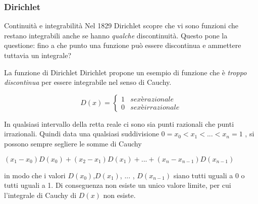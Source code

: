 \begin{frame}[label=Dirichlet]
  \frametitle{Dirichlet}
  \begin{block}{Continuità e integrabilità}    
  Nel 1829 Dirichlet scopre che vi sono funzioni che restano integrabili anche se hanno \textit{qualche} discontinuità.
  Questo pone la questione: fino a che punto una funzione può essere discontinua e ammettere tuttavia un integrale?
  \end{block}  
  \begin{block}{La funzione di Dirichlet}    
    Dirichlet propone un esempio di funzione che è \textit{troppo discontinua} per essere integrabile nel senso di Cauchy.
    
    \begin{equation*}
      D(x) =
      \begin{cases*}
        1 & se x è razionale \\
        0 & se x è irrazionale
      \end{cases*}
    \end{equation*}

    In qualsiasi intervallo della retta reale ci sono sia punti razionali che punti irrazionali. Quindi data una qualsiasi suddivisione
    $ 0 = x_0 < x_1 < ... < x_n = 1$ , si possono sempre segliere le somme di Cauchy \begin{center}
      $(x_1 - x_0)D(x_0) + (x_2 - x_1)D(x_1) + ... + (x_n - x_{n-1})D(x_{n-1})$
    \end{center}
    in modo che i valori $D(x_0)$,$D(x_1)$, ... , $D(x_{n-1})$ siano tutti uguali a 0 o tutti uguali a 1. Di conseguenza non esiste un 
    unico valore limite, per cui l'integrale di Cauchy di $D(x)$ \alert{non esiste}.
  \end{block}  
  
\end{frame}



